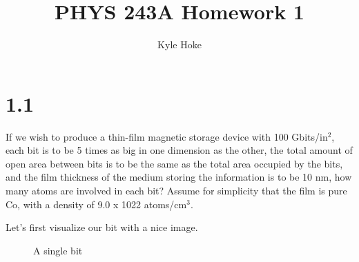 \documentclass[12pt]{article}
\title{\LARGE PHYS 243A Homework 1}
\author{Kyle Hoke}
\makeatletter
\renewcommand{\maketitle} %
{ \begingroup \vskip 10pt \begin{center} \large {\bf \@title}
	\vskip 10pt \large \@author \hskip 20pt \@date \end{center}
  \vskip 10pt \endgroup \setcounter{footnote}{0} }
\renewcommand{\=}[1]{\stackrel{#1}{=}} %
\theoremstyle{definition}
\theoremstyle{remark}
\makeatother
\begin{document}
\maketitle
\thispagestyle{empty}






\section*{1.1}

\begin{bclogo}[logo=\bcquestion , barre=none]
\newline
If we wish to produce a thin-film magnetic storage device with 100 Gbits/in$^2$, each bit is to be 5
times as big in one dimension as the other, the total amount of open area between bits is to be the
same as the total area occupied by the bits, and the film thickness of the medium storing the
information is to be 10 nm, how many atoms are involved in each bit? Assume for simplicity that the
film is pure Co, with a density of 9.0 x 1022 atoms/cm$^3$.
\end{bclogo}
\vspace{1cm}


Let's first visualize our bit with a nice image.

\begin{figure}[H]
 \centering
 \caption{A single bit}
 \label{bit}
\end{figure}
\end{document}
